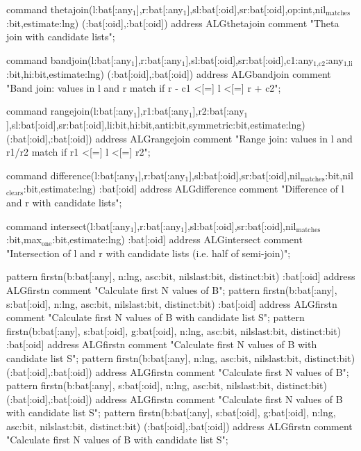 \documentclass[11pt]{article}
\begin{document}
command thetajoin(l:bat[:any\(_{\text{1}}\)],r:bat[:any\(_{\text{1}}\)],sl:bat[:oid],sr:bat[:oid],op:int,nil\(_{\text{matches}}\):bit,estimate:lng) (:bat[:oid],:bat[:oid])
address ALGthetajoin
comment "Theta join with candidate lists";

command bandjoin(l:bat[:any\(_{\text{1}}\)],r:bat[:any\(_{\text{1}}\)],sl:bat[:oid],sr:bat[:oid],c1:any\(_{\text{1,c2}}\):any\(_{\text{1,li}}\):bit,hi:bit,estimate:lng) (:bat[:oid],:bat[:oid])
address ALGbandjoin
comment "Band join: values in l and r match if r - c1 <[=] l <[=] r + c2";

command rangejoin(l:bat[:any\(_{\text{1}}\)],r1:bat[:any\(_{\text{1}}\)],r2:bat[:any\(_{\text{1}}\)],sl:bat[:oid],sr:bat[:oid],li:bit,hi:bit,anti:bit,symmetric:bit,estimate:lng) (:bat[:oid],:bat[:oid])
address ALGrangejoin
comment "Range join: values in l and r1/r2 match if r1 <[=] l <[=] r2";

command difference(l:bat[:any\(_{\text{1}}\)],r:bat[:any\(_{\text{1}}\)],sl:bat[:oid],sr:bat[:oid],nil\(_{\text{matches}}\):bit,nil\(_{\text{clears}}\):bit,estimate:lng) :bat[:oid]
address ALGdifference
comment "Difference of l and r with candidate lists";

command intersect(l:bat[:any\(_{\text{1}}\)],r:bat[:any\(_{\text{1}}\)],sl:bat[:oid],sr:bat[:oid],nil\(_{\text{matches}}\):bit,max\(_{\text{one}}\):bit,estimate:lng) :bat[:oid]
address ALGintersect
comment "Intersection of l and r with candidate lists (i.e. half of semi-join)";

pattern firstn(b:bat[:any], n:lng, asc:bit, nilslast:bit, distinct:bit) :bat[:oid]
address ALGfirstn
comment "Calculate first N values of B";
pattern firstn(b:bat[:any], s:bat[:oid], n:lng, asc:bit, nilslast:bit, distinct:bit) :bat[:oid]
address ALGfirstn
comment "Calculate first N values of B with candidate list S";
pattern firstn(b:bat[:any], s:bat[:oid], g:bat[:oid], n:lng, asc:bit, nilslast:bit, distinct:bit) :bat[:oid]
address ALGfirstn
comment "Calculate first N values of B with candidate list S";
pattern firstn(b:bat[:any], n:lng, asc:bit, nilslast:bit, distinct:bit) (:bat[:oid],:bat[:oid])
address ALGfirstn
comment "Calculate first N values of B";
pattern firstn(b:bat[:any], s:bat[:oid], n:lng, asc:bit, nilslast:bit, distinct:bit) (:bat[:oid],:bat[:oid])
address ALGfirstn
comment "Calculate first N values of B with candidate list S";
pattern firstn(b:bat[:any], s:bat[:oid], g:bat[:oid], n:lng, asc:bit, nilslast:bit, distinct:bit) (:bat[:oid],:bat[:oid])
address ALGfirstn
comment "Calculate first N values of B with candidate list S";
\end{document}
